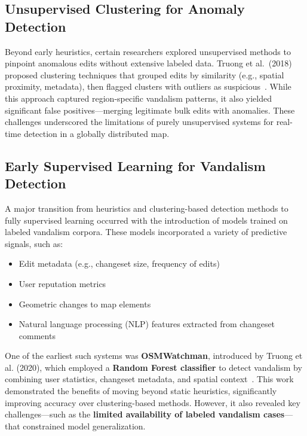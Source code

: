 \documentclass[
    13pt, %
    a4paper, %
    listof=totoc, %
    bibliography=totoc, %
    index=totoc, %
    headsepline
]{scrreprt}
\begin{document}
\subsection{Unsupervised Clustering for Anomaly Detection}
\label{sec:clustering_methods}

Beyond early heuristics, certain researchers explored unsupervised methods to pinpoint anomalous edits without extensive labeled data. Truong et al.\ (2018) proposed clustering techniques that grouped edits by similarity (e.g., spatial proximity, metadata), then flagged clusters with outliers as suspicious~\cite{Truong2018}. While this approach captured region-specific vandalism patterns, it also yielded significant false positives—merging legitimate bulk edits with anomalies. These challenges underscored the limitations of purely unsupervised systems for real-time detection in a globally distributed map. 

\subsection{Early Supervised Learning for Vandalism Detection}
\label{sec:transition_to_ml}

A major transition from heuristics and clustering-based detection methods to fully supervised learning occurred with the introduction of models trained on labeled vandalism corpora. These models incorporated a variety of predictive signals, such as:
\begin{itemize}
    \item Edit metadata (e.g., changeset size, frequency of edits)
    \item User reputation metrics
    \item Geometric changes to map elements
    \item Natural language processing (NLP) features extracted from changeset comments
\end{itemize}

One of the earliest such systems was \textbf{OSMWatchman}, introduced by Truong et al. (2020), which employed a \textbf{Random Forest classifier} to detect vandalism by combining user statistics, changeset metadata, and spatial context~\cite{Truong2020}. This work demonstrated the benefits of moving beyond static heuristics, significantly improving accuracy over clustering-based methods. However, it also revealed key challenges—such as the \textbf{limited availability of labeled vandalism cases}—that constrained model generalization.
\end{document}
